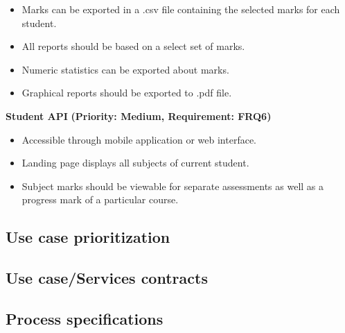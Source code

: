 \documentclass[12pt]{article}
\begin{document}
				\begin{itemize}
					\item Marks can be exported in a .csv file containing the selected marks for each student.
					\item All reports should be based on a select set of marks.
					\item Numeric statistics can be exported about marks.
					\item Graphical reports should be exported to .pdf file.
				\end{itemize}
				
			\vspace{0.2in}
			
			\begin{flushleft}
				\textbf{Student API}
				\textbf{(Priority: Medium, Requirement: FRQ6)}
			\end{flushleft}
			
				\begin{itemize}
					\item Accessible through mobile application or web interface.
					\item Landing page displays all subjects of current student.
					\item Subject marks should be viewable for separate assessments as well as a progress mark of a particular course.
				\end{itemize}
				
			\vspace{0.2in}
		
		\subsection{Use case prioritization}
		
			\vspace{0.2in}
			
			
		
		\subsection{Use case/Services contracts}
		
			\vspace{0.2in}
			
			
		
		\subsection{Process specifications}
		
\end{document}
